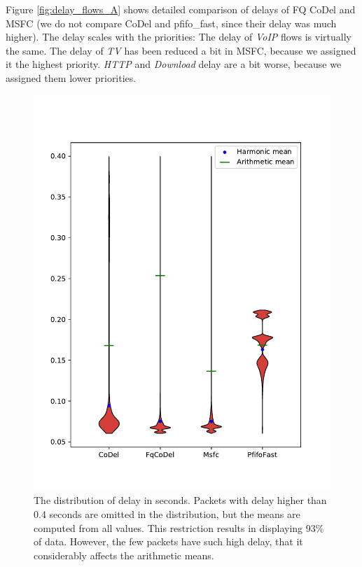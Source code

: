 Figure \ref{fig:delay_flows_A} shows detailed comparison of delays of FQ CoDel and MSFC (we do not compare CoDel and pfifo\_fast, since their delay was much higher). The delay scales with the priorities: The delay of \emph{VoIP} flows is virtually the same. The delay of \emph{TV} has been reduced a bit in MSFC, because we assigned it the highest priority. \emph{HTTP} and \emph{Download} delay are a bit worse, because we assigned them lower priorities.


\begin{figure}
	\centering
	\includegraphics[width=137mm]{drawings/overall-delay-down}
	\caption{The distribution of delay in seconds. Packets with delay higher than 0.4 seconds are omitted in the distribution, but the means are computed from all values. This restriction results in displaying 93\% of data. However, the few packets have such high delay, that it considerably affects the arithmetic means. }
	\label{fig:overall_delay}
\end{figure}

